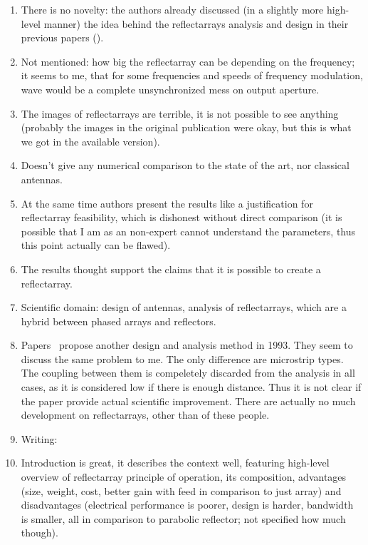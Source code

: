\documentclass{article}
\begin{document}
\begin{enumerate}
        \item There is no novelty: the authors already discussed (in a slightly more high-level manner) the idea behind the reflectarrays analysis and design in their previous papers (\cite{targonski.pozar_1994jun,pozar.metzler_1993apr}).
        \item Not mentioned: how big the reflectarray can be depending on the frequency; it seems to me, that for some frequencies and speeds of frequency modulation, wave would be a complete unsynchronized mess on output aperture.
        \item The images of reflectarrays are terrible, it is not possible to see anything (probably the images in the original publication were okay, but this is what we got in the available version).
        \item Doesn't give any numerical comparison to the state of the art, nor classical antennas.
        \item At the same time authors present the results like a justification for reflectarray feasibility, which is dishonest without direct comparison (it is possible that I am as an non-expert cannot understand the parameters, thus this point actually can be flawed).
        \item The results thought support the claims that it is possible to create a reflectarray.
        \item Scientific domain: design of antennas, analysis of reflectarrays, which are a hybrid between phased arrays and reflectors.
        \item Papers~\cite{zhuang.etal_1993jun,javor.etal_1995sep} propose another design and analysis method in 1993. They seem to discuss the same problem to me. The only difference are microstrip types. The coupling between them is compeletely discarded from the analysis in all cases, as it is considered low if there is enough distance. Thus it is not clear if the paper provide actual scientific improvement. There are actually no much development on reflectarrays, other than of these people.
        \item Writing:
        \item Introduction is great, it describes the context well, featuring high-level overview of reflectarray principle of operation, its composition, advantages (size, weight, cost, better gain with feed in comparison to just array) and disadvantages (electrical performance is poorer, design is harder, bandwidth is smaller, all in comparison to parabolic reflector; not specified how much though).

\end{enumerate}
\end{document}
